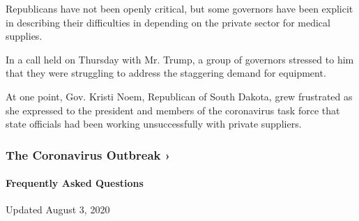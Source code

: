 Republicans have not been openly critical, but some governors have been
explicit in describing their difficulties in depending on the private
sector for medical supplies.

In a call held on Thursday with Mr. Trump, a group of governors stressed
to him that they were struggling to address the staggering demand for
equipment.

At one point, Gov. Kristi Noem, Republican of South Dakota, grew
frustrated as she expressed to the president and members of the
coronavirus task force that state officials had been working
unsuccessfully with private suppliers.

\href{https://www.nytimes3xbfgragh.onion/news-event/coronavirus?action=click\&pgtype=Article\&state=default\&region=MAIN_CONTENT_3\&context=storylines_faq}{}

\hypertarget{the-coronavirus-outbreak-}{%
\subsubsection{The Coronavirus Outbreak
›}\label{the-coronavirus-outbreak-}}

\hypertarget{frequently-asked-questions}{%
\paragraph{Frequently Asked
Questions}\label{frequently-asked-questions}}

Updated August 3, 2020

